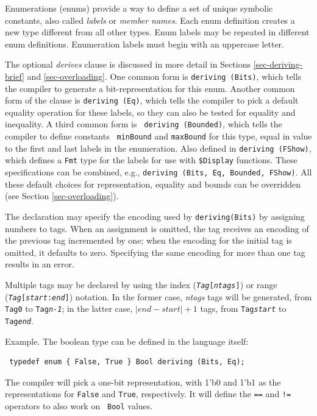 \documentclass[twoside,letterpaper]{article}
\newcommand{\te}[1]{\texttt{#1}}
\newcommand{\nterm}[1]{\emph{#1}}
\begin{document}
\index{enum@\te{enum}}
Enumerations (enums) provide a way to define a set of unique symbolic
constants, also called \emph{labels} or \emph{member names}.  Each
enum definition creates a new type different from all other types.
Enum labels may be repeated in different enum definitions.
Enumeration labels must
begin with an uppercase letter.

The optional \nterm{derives} clause is discussed in more detail in
Sections \ref{sec-deriving-brief} and \ref{sec-overloading}. One
common form is \texttt{deriving (Bits)}, which tells the compiler to
generate a bit-representation for this enum.  Another common form of
the clause is \texttt{deriving (Eq)}, which tells the compiler to pick a
default equality operation for these labels, so they can also be
tested for equality and inequality.  A third common form is {\tt
deriving (Bounded)}, which tells the compiler to define constants {\tt
minBound} and \texttt{maxBound} for this type, equal in value to the
first and last labels in the enumeration.  Also defined in
\te{deriving (FShow)}, which defines a \te{Fmt} type for the labels
for use with \te{\$Display}  functions.  These specifications can be
combined, e.g., \texttt{deriving (Bits, Eq, Bounded, FShow)}.  All these default
choices for representation, equality and bounds can be overridden (see
Section {\ref{sec-overloading}}). 

The declaration may specify the encoding used by \texttt{deriving(Bits)}
by assigning numbers to tags.  When an assignment is omitted, the tag
receives an encoding of the previous tag incremented by one; when the
encoding for the initial tag is omitted, it defaults to zero.
Specifying the same encoding for more than one tag results in an
error.

Multiple tags may be declared by using the index
(\texttt{\emph{Tag}[\emph{ntags}]}) or range
(\texttt{\emph{Tag}[\emph{start}:\emph{end}]}) notation.  In the
former case, \emph{ntags} tags will be generated, from
\texttt{Tag0} to \texttt{Tag\emph{n-1}}; in the latter case,
$\left|\mathit{end}-\mathit{start}\right|+1$ tags, from
\texttt{Tag\emph{start}} to
\texttt{Tag\emph{end}}.

Example.  The boolean type can be defined in the language itself:
\begin{verbatim}
 typedef enum { False, True } Bool deriving (Bits, Eq);
\end{verbatim}
The compiler will pick a one-bit representation, with 1'b0 and 1'b1 as
the representations for \texttt{False} and \texttt{True}, respectively.  It
will define the \texttt{==} and \texttt{!=} operators to also work on {\tt
Bool} values.
\end{document}
